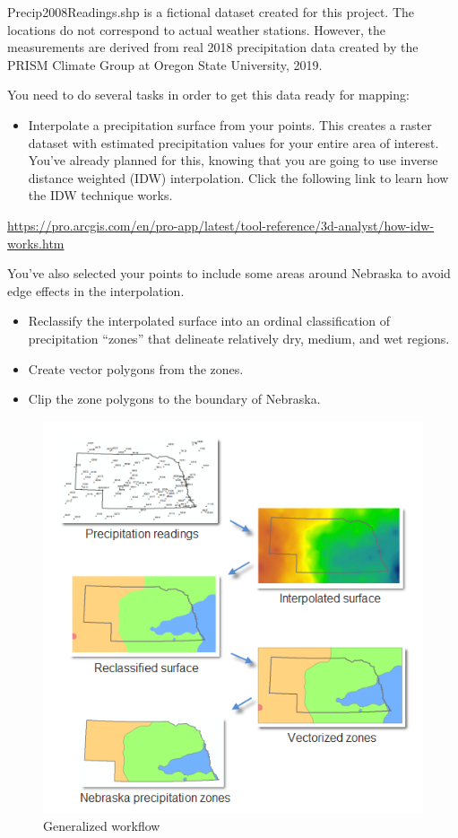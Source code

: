 \documentclass[]{article}
\providecommand{\tightlist}{%
  \setlength{\itemsep}{0pt}\setlength{\parskip}{0pt}}
\begin{document}
Precip2008Readings.shp is a fictional dataset created for this project.
The locations do not correspond to actual weather stations. However, the
measurements are derived from real 2018 precipitation data created by
the PRISM Climate Group at Oregon State University, 2019.

You need to do several tasks in order to get this data ready for
mapping:

\begin{itemize}
\tightlist
\item
  Interpolate a precipitation surface from your points. This creates a
  raster dataset with estimated precipitation values for your entire
  area of interest. You've already planned for this, knowing that you
  are going to use inverse distance weighted (IDW) interpolation. Click
  the following link to learn how the IDW technique works.
\end{itemize}

\url{https://pro.arcgis.com/en/pro-app/latest/tool-reference/3d-analyst/how-idw-works.htm}

You've also selected your points to include some areas around Nebraska
to avoid edge effects in the interpolation.

\begin{itemize}
\item
  Reclassify the interpolated surface into an ordinal classification of
  precipitation ``zones'' that delineate relatively dry, medium, and wet
  regions.
\item
  Create vector polygons from the zones.
\item
  Clip the zone polygons to the boundary of Nebraska.
\end{itemize}

\begin{figure}
\centering
\includegraphics{./labs/images/project1_model_workflow.png}
\caption{Generalized workflow}
\end{figure}
\end{document}
